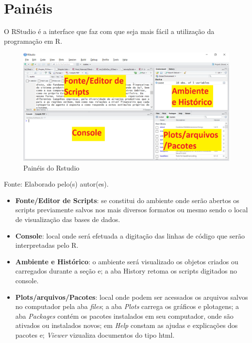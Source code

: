 \documentclass[12pt,portuguese,oneside]{book}
\providecommand{\tightlist}{%
  \setlength{\itemsep}{0pt}\setlength{\parskip}{0pt}}
\begin{document}
\section{Painéis}\label{paineis}

O RStudio é a interface que faz com que seja mais fácil a utilização da
programação em R.

\begin{figure}[H]

{\centering \includegraphics[width=0.8\linewidth]{paineis} 

}

\caption{Painéis do Rstudio}\label{fig:paineis1}
\end{figure}

Fonte: Elaborado pelo(s) autor(es).

\begin{itemize}
\tightlist
\item
  \textbf{Fonte/Editor de Scripts}: se constitui do ambiente onde serão
  abertos os scripts previamente salvos nos mais diversos formatos ou
  mesmo sendo o local de visualização das bases de dados.
\item
  \textbf{Console}: local onde será efetuada a digitação das linhas de
  código que serão interpretadas pelo R.
\item
  \textbf{Ambiente e Histórico}: o ambiente será visualizado os objetos
  criados ou carregados durante a seção e; a aba History retoma os
  scripts digitados no console.
\item
  \textbf{Plots/arquivos/Pacotes}: local onde podem ser acessados os
  arquivos salvos no computador pela aba \emph{files}; a aba
  \emph{Plots} carrega os gráficos e plotagens; a aba \emph{Packages}
  contém os pacotes instalados em seu computador, onde são ativados ou
  instalados novos; em \emph{Help} constam as ajudas e explicações dos
  pacotes e; \emph{Viewer} vizualiza documentos do tipo html.
\end{itemize}
\end{document}
